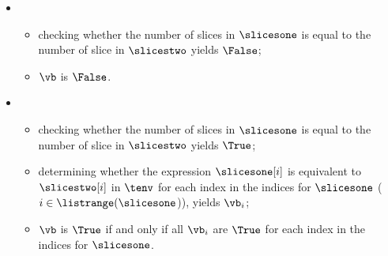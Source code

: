 \ProseParagraph
\OneApplies
\begin{itemize}
  \item {}
  \begin{itemize}
    \item checking whether the number of slices in $\slicesone$ is equal to the number of slice in $\slicestwo$ yields $\False$;
    \item $\vb$ is $\False$.
  \end{itemize}

  \item {}
  \begin{itemize}
    \item checking whether the number of slices in $\slicesone$ is equal to the number of slice in $\slicestwo$ yields $\True$;
    \item determining whether the expression $\slicesone[i]$ is equivalent to $\slicestwo[i]$ in $\tenv$
          for each index in the indices for $\slicesone$ ($i \in \listrange(\slicesone$)), yields $\vb_i$\ProseOrTypeError;
    \item $\vb$ is $\True$ if and only if all $\vb_i$ are $\True$ for each index in the indices for $\slicesone$.
  \end{itemize}
\end{itemize}

\FormallyParagraph
{}


